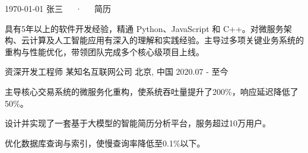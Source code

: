 \documentclass[11pt, a4paper]{awesome-cv}
\begin{document}
\makecvheader

\makecvfooter
  {\today}
  {张三~~~·~~~简历}
  {\thepage}

\begin{cvparagraph}
具有5年以上的软件开发经验，精通 Python、JavaScript 和 C++。对微服务架构、云计算及人工智能应用有深入的理解和实践经验。主导过多项关键业务系统的重构与性能优化，带领团队完成多个核心级项目上线。
\end{cvparagraph}

\begin{cventries}
  \cventry
    {资深开发工程师} %
    {某知名互联网公司} %
    {北京, 中国} %
    {2020.07 - 至今} %
    {
      \begin{cvitems}
        \item {主导核心交易系统的微服务化重构，使系统吞吐量提升了200\%，响应延迟降低了50\%。}
        \item {设计并实现了一套基于大模型的智能简历分析平台，服务超过10万用户。}
        \item {优化数据库查询与索引，使慢查询率降低至0.1\%以下。}
      \end{cvitems}
    }
\end{cventries}
\end{document}
